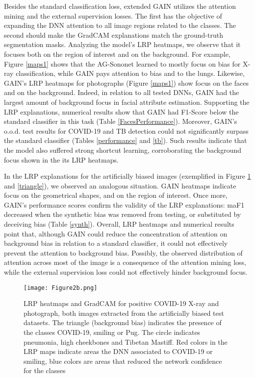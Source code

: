 \documentclass[fleqn,10pt]{wlscirep}
\begin{document}
{Besides the standard classification loss, extended GAIN utilizes the attention mining and the external supervision losses\cite{GAIN}. The first has the objective of expanding the DNN attention to all image regions related to the classes. The second should make the GradCAM explanations match the ground-truth segmentation masks. Analyzing the model's LRP heatmaps, we observe that it focuses both on the region of interest and on the background. For example, Figure \ref{maps1} shows that the AG-Sononet learned to mostly focus on bias for X-ray classification, while GAIN pays attention to bias and to the lungs. Likewise, GAIN's LRP heatmaps for photographs (Figure \ref{maps1}) show focus on the faces and on the background. Indeed, in relation to all tested DNNs, GAIN had the largest amount of background focus in facial attribute estimation. Supporting the LRP explanations, numerical results show that GAIN had F1-Score below the standard classifier in this task (Table \ref{FacesPerformance}). Moreover, GAIN's o.o.d. test results for COVID-19 and TB detection could not significantly surpass the standard classifier (Tables \ref{performance} and \ref{tb}). Such results indicate that the model also suffered strong shortcut learning, corroborating the background focus shown in the its LRP heatmaps.

In the LRP explanations for the artificially biased images (exemplified in Figure \ref{spurious} and \ref{triangle}), we observed an analogous situation. GAIN heatmaps indicate focus on the geometrical shapes, and on the region of interest. Once more, GAIN's performance scores confirm the validity of the LRP explanations: maF1 decreased when the synthetic bias was removed from testing, or substituted by deceiving bias (Table \ref{synth}). Overall, LRP heatmaps and numerical results point that, although GAIN could reduce the concentration of attention on background bias in relation to a standard classifier, it could not effectively prevent the attention to background bias. Possibly, the observed distribution of attention across most of the image is a consequence of the attention mining loss, while the external supervision loss could not effectively hinder background focus.

\begin{figure}[!h]
\texttt{[image: Figure2b.png]}
\centering
\caption{LRP heatmaps and GradCAM for positive COVID-19 X-ray and photograph, both images extracted from the artificially biased test datasets. The triangle (background bias) indicates the presence of the classes COVID-19, smiling or Pug. The circle indicates pneumonia, high cheekbones and Tibetan Mastiff. Red colors in the LRP maps indicate areas the DNN associated to COVID-19 or smiling, blue colors are areas that reduced the network confidence for the classes}
\label{spurious}
\end{figure}

}
\end{document}
